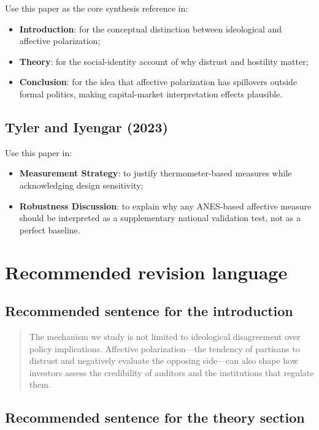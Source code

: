 \documentclass[12pt]{article}
\begin{document}
Use this paper as the core synthesis reference in:
\begin{itemize}
    \item \textbf{Introduction}: for the conceptual distinction between ideological and affective polarization;
    \item \textbf{Theory}: for the social-identity account of why distrust and hostility matter;
    \item \textbf{Conclusion}: for the idea that affective polarization has spillovers outside formal politics, making capital-market interpretation effects plausible.
\end{itemize}

\subsection{Tyler and Iyengar (2023)}

Use this paper in:
\begin{itemize}
    \item \textbf{Measurement Strategy}: to justify thermometer-based measures while acknowledging design sensitivity;
    \item \textbf{Robustness Discussion}: to explain why any ANES-based affective measure should be interpreted as a supplementary national validation test, not as a perfect baseline.
\end{itemize}

\section{Recommended revision language}

\subsection*{Recommended sentence for the introduction}

\begin{quote}
The mechanism we study is not limited to ideological disagreement over policy implications. Affective polarization---the tendency of partisans to distrust and negatively evaluate the opposing side---can also shape how investors assess the credibility of auditors and the institutions that regulate them.
\end{quote}

\subsection*{Recommended sentence for the theory section}
\end{document}
